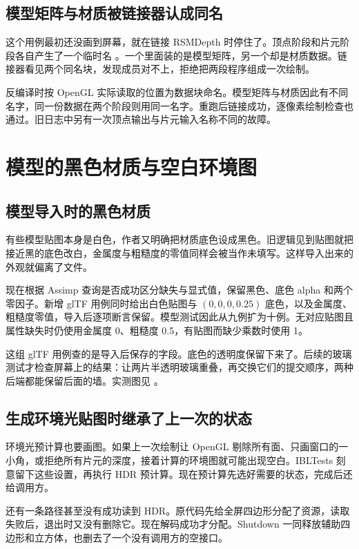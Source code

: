 \subsection{模型矩阵与材质被链接器认成同名}
这个用例最初还没画到屏幕，就在链接 RSMDepth 时停住了。顶点阶段和片元阶段各自产生了一个临时名 。一个里面装的是模型矩阵，另一个却是材质数据。链接器看见两个同名块，发现成员对不上，拒绝把两段程序组成一次绘制。

反编译时按 OpenGL 实际读取的位置为数据块命名。模型矩阵与材质因此有不同名字，同一份数据在两个阶段则用同一名字。重跑后链接成功，逐像素绘制检查也通过。旧日志中另有一次顶点输出与片元输入名称不同的故障。

\newpage
\section{模型的黑色材质与空白环境图}
\subsection{模型导入时的黑色材质}
有些模型贴图本身是白色，作者又明确把材质底色设成黑色。旧逻辑见到贴图就把接近黑的底色改白，金属度与粗糙度的零值同样会被当作未填写。这样导入出来的外观就偏离了文件。

现在根据 Assimp 查询是否成功区分缺失与显式值，保留黑色、底色 alpha 和两个零因子。新增 glTF 用例同时给出白色贴图与 $(0,0,0,0.25)$ 底色，以及金属度、粗糙度零值，导入后逐项断言保留。模型测试因此从九例扩为十例。无对应贴图且属性缺失时仍使用金属度 0、粗糙度 0.5，有贴图而缺少乘数时使用 1。

这组 glTF 用例查的是导入后保存的字段。底色的透明度保留下来了。后续的玻璃测试才检查屏幕上的结果：让两片半透明玻璃重叠，再交换它们的提交顺序，两种后端都能保留后面的墙。实测图见 。

\subsection{生成环境光贴图时继承了上一次的状态}
环境光预计算也要画图。如果上一次绘制让 OpenGL 剔除所有面、只画窗口的一小角，或拒绝所有片元的深度，接着计算的环境图就可能出现空白。IBLTests 刻意留下这些设置，再执行 HDR 预计算。现在预计算先选好需要的状态，完成后还给调用方。

还有一条路径甚至没有成功读到 HDR。原代码先给全屏四边形分配了资源，读取失败后，退出时又没有删除它。现在解码成功才分配。Shutdown 一同释放辅助四边形和立方体，也删去了一个没有调用方的空接口。

